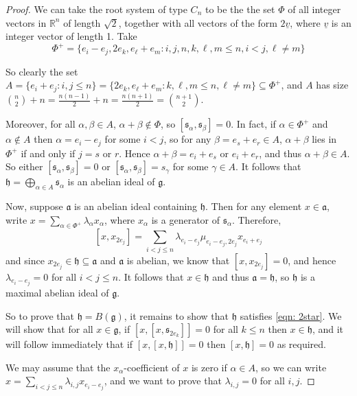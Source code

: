 \documentclass[12pt,a4paper]{article}
\theoremstyle{definition}
\theoremstyle{remark}
\theoremstyle{custthm}
\begin{document}
\begin{proof}

We can take the root system of type $C_n$ to be the the set $\Phi$ of all integer vectors in $\mathbb{R}^n$ of length $\sqrt{2}$, together with all vectors of the form $2\underline{v}$, where $\underline{v}$ is an integer vector of length 1. Take $$\Phi^+=\{e_i-e_j,2e_k,e_\ell+e_m:i,j,n,k,\ell,m\leq n, i<j,\ell\neq m\}$$

So clearly the set $A=\{e_i+e_j:i,j\leq n\}=\{2e_k,e_\ell+e_m:k,\ell,m\leq n,\ell\neq m\}\subseteq\Phi^+$, and $A$ has size $\binom{n}{2}+n=\frac{n(n-1)}{2}+n=\frac{n(n+1)}{2}=\binom{n+1}{2}$.

Moreover, for all $\alpha,\beta\in A$, $\alpha+\beta\notin\Phi$, so $[\mathfrak{s}_\alpha,\mathfrak{s}_\beta]=0$. In fact, if $\alpha\in\Phi^+$ and $\alpha\notin A$ then $\alpha=e_i-e_j$ for some $i<j$, so for any $\beta=e_s+e_r\in A$, $\alpha+\beta$ lies in $\Phi^+$ if and only if $j=s$ or $r$. Hence $\alpha+\beta=e_i+e_s$ or $e_i+e_r$, and thus $\alpha+\beta\in A$. So either $[\mathfrak{s}_\alpha,\mathfrak{s}_\beta]=0$ or $[\mathfrak{s}_\alpha,\mathfrak{s}_\beta]=s_\gamma$ for some $\gamma\in A$. It follows that $\mathfrak{h}=\underset{\alpha\in A}{\bigoplus}\mathfrak{s}_\alpha$ is an abelian ideal of $\mathfrak{g}$.

Now, suppose $\mathfrak{a}$ is an abelian ideal containing $\mathfrak{h}$. Then for any element $x\in\mathfrak{a}$, write $x=\underset{\alpha\in\Phi^+}{\sum}\lambda_\alpha x_\alpha$, where $x_{\alpha}$ is a generator of $\mathfrak{s}_{\alpha}$. Therefore, $$[x,x_{2e_j}]=\underset{i<j\leq n}{\sum}\lambda_{e_i-e_j}\mu_{e_i-e_j,2e_j}x_{e_i+e_j}$$ and since $x_{2e_j}\in\mathfrak{h}\subseteq\mathfrak{a}$ and $\mathfrak{a}$ is abelian, we know that $[x,x_{2e_j}]=0$, and hence $\lambda_{e_i-e_j}=0$ for all $i<j\leq n$. It follows that $x\in\mathfrak{h}$ and thus $\mathfrak{a}=\mathfrak{h}$, so $\mathfrak{h}$ is a maximal abelian ideal of $\mathfrak{g}$. 

So to prove that $\mathfrak{h}=B(\mathfrak{g})$, it remains to show that $\mathfrak{h}$ satisfies \eqref{eqn: 2star}. We will show that for all $x\in\mathfrak{g}$, if $[x,[x,\mathfrak{s}_{2e_k}]]=0$ for all $k\leq n$ then $x\in\mathfrak{h}$, and it will follow immediately that if $[x,[x,\mathfrak{h}]]=0$ then $[x,\mathfrak{h}]=0$ as required.

We may assume that the $x_{\alpha}$-coefficient of $x$ is zero if $\alpha\in A$, so we can write $x=\underset{i<j\leq n}{\sum}\lambda_{i,j}x_{e_i-e_j}$, and we want to prove that $\lambda_{i,j}=0$ for all $i,j$.


\end{proof}
\end{document}
